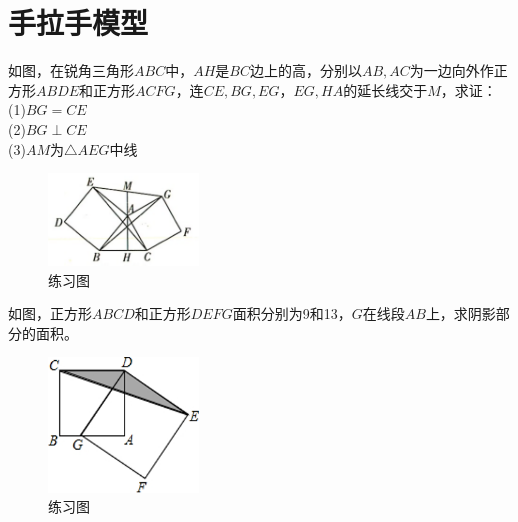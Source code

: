 \documentclass{ecnuthesis}
\begin{document}
\section{手拉手模型}
\begin{example}
    如图，在锐角三角形$ABC$中，$AH$是$BC$边上的高，分别以$AB,AC$为一边向外作正方形$ABDE$和正方形$ACFG$，连$CE,BG,EG$，$EG,HA$的延长线交于$M$，求证：\\
    (1)$BG=CE$ \\
    (2)$BG\perp CE$ \\
    (3)$AM$为$\triangle AEG$中线 \\
\end{example}
\begin{figure}[H]
\centering
\includegraphics[width=4cm]{picture/675.png}
\caption{练习图}
\end{figure}
\begin{problem}
    如图，正方形$ABCD$和正方形$DEFG$面积分别为9和13，$G$在线段$AB$上，求阴影部分的面积。
\end{problem}
\begin{figure}[H]
\centering
\includegraphics[width=4cm]{picture/615.png}
\caption{练习图}
\end{figure}
\clearpage
\end{document}
